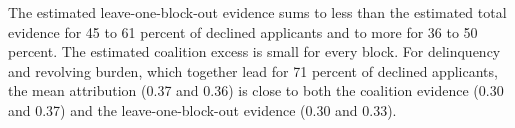 The estimated leave-one-block-out evidence sums to less than the estimated total evidence for 45 to 61 percent of declined applicants and to more for 36 to 50 percent. The estimated coalition excess is small for every block. For delinquency and revolving burden, which together lead for 71 percent of declined applicants, the mean attribution (0.37 and 0.36) is close to both the coalition evidence (0.30 and 0.37) and the leave-one-block-out evidence (0.30 and 0.33).


